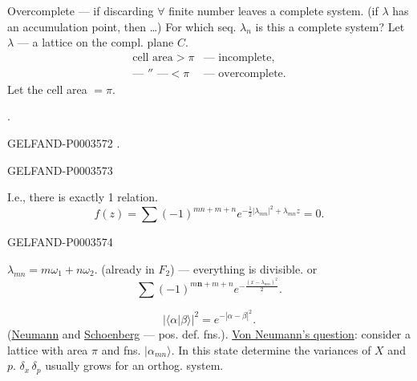 Overcomplete --- if discarding $\forall$ finite number leaves a complete system.
(if $\lambda$ has an accumulation point, then \ldots)
For which seq. $\lambda_n$ is this a complete system?
Let $\lambda$ --- a lattice on the compl. plane $C$.
\begin{equation*}\begin{array}{ll}
\text{cell area}>\pi&\text{--- incomplete},\\
\text{--- ″ ---}<\pi&\text{--- overcomplete}.
\end{array}\end{equation*}
Let the cell area $=\pi$.

.

\begin{GelfandAdjacentEvidence}{GELFAND-P000357}{2}
.
\end{GelfandAdjacentEvidence}
\begin{GelfandAdjacentEvidence}{GELFAND-P000357}{3}

I.e., there is exactly 1 relation.
\begin{equation*}f (z)=\sum (-1)^{mn+m+n}e^{-\frac12|\lambda_{mn}|^2+\lambda_{mn}z}=0.\end{equation*}
\end{GelfandAdjacentEvidence}
\begin{GelfandAdjacentEvidence}{GELFAND-P000357}{4}

$\lambda_{mn}=m\omega_1+n\omega_2$.
(already in $F_2$) --- everything is divisible.
or
\begin{equation*}\sum (-1)^{m\boldsymbol{n}+m+n}e^{-\frac{(x-\lambda_{mn})^2}{2}}.\end{equation*}
\end{GelfandAdjacentEvidence}

\begin{equation*}|\langle\alpha|\beta\rangle|^2=e^{-|\alpha-\beta|^2}.\end{equation*}
(\uline{Neumann} and \uline{Schoenberg} --- pos. def. fns.).
\uline{Von Neumann\textquoteright s question}:
consider a lattice with area $\pi$ and fns. $|\alpha_{mn}\rangle$.
In this state determine the variances of $X$ and $p$.
$\delta_x\,\delta_p$ usually grows for an orthog. system.


